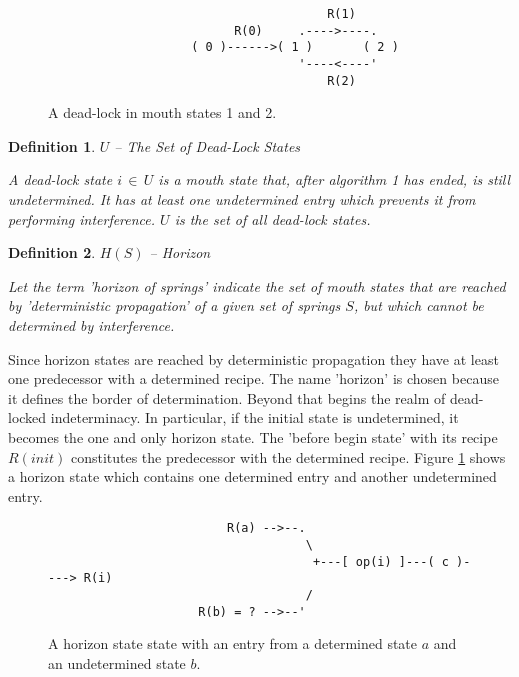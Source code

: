 \documentclass[12pt,a4paper]{scrartcl}
\newtheorem{definition}{Definition}
\begin{document}
\begin{figure}[htbp] \leavevmode
\begin{verbatim}
                                       R(1)
                          R(0)     .---->----.
                    ( 0 )------>( 1 )       ( 2 )
                                   '----<----'
                                       R(2)

\end{verbatim}
\caption{A dead-lock in mouth states 1 and 2.}
\end{figure}

\begin{definition} $U$ -- The Set of Dead-Lock States

A dead-lock state $i\,\in\,U$ is a mouth state that, after algorithm 1 has
ended, is still undetermined. It has at least one undetermined entry which
prevents it from performing interference. $U$ is the set of all dead-lock
states.

\end{definition}


\begin{definition} $H(S)$ -- Horizon

    Let the term 'horizon of springs' indicate the set of mouth states that are
    reached by 'deterministic propagation' of a given set of springs $S$, but
    which cannot be determined by interference.

\end{definition}

Since horizon states are reached by deterministic propagation they have at least
one predecessor with a determined recipe.  The name 'horizon' is chosen because
it defines the border of determination.  Beyond that begins the realm of
dead-locked indeterminacy.  In particular, if the initial state is undetermined, it becomes
the one and only horizon state. The 'before begin state' with its recipe
$R(init)$ constitutes the predecessor with the determined recipe.  Figure
\ref{fig:horizon-state} shows a horizon state which contains one determined
entry and another undetermined entry. 

\begin{figure}[htbp] \leavevmode \label{fig:horizon-state}
\begin{verbatim}
                         R(a) -->--.
                                    \
                                     +---[ op(i) ]---( c )----> R(i)
                                    /
                     R(b) = ? -->--'

\end{verbatim}
\caption{A horizon state state with an entry from a determined state $a$ and 
    an undetermined state $b$.}
\end{figure}
\end{document}
